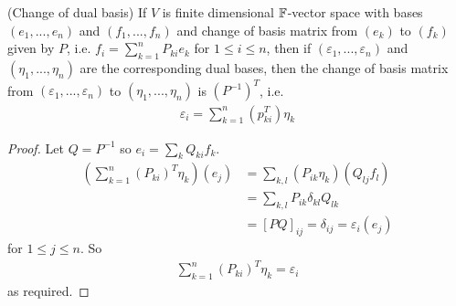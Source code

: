 \documentclass[a4paper]{article}
\begin{document}
\begin{prop} (Change of dual basis) If $V$ is finite dimensional $\mathbb{F}$-vector space with bases $\left(e_1,...,e_n\right)$ and $\left(f_1,...,f_n\right)$ and change of basis matrix from $\left(e_k\right)$ to $\left(f_k\right)$ given by $P$, i.e. $f_i = \sum_{k=1}^n P_{ki}e_k$ for $1 \leq i \leq n$, then if $\left(\varepsilon_1,...,\varepsilon_n\right)$ and $\left(\eta_1,...,\eta_n\right)$ are the corresponding dual bases, then the change of basis matrix from $\left(\varepsilon_1,...,\varepsilon_n\right)$ to $\left(\eta_1,...,\eta_n\right)$ is $\left(P^{-1}\right)^T$, i.e.
\begin{equation*}
\begin{aligned}
\varepsilon_i = \sum_{k=1}^n \left(p_{ki}^T\right) \eta_k
\end{aligned}
\end{equation*}

\begin{proof}
Let $Q=P^{-1}$ so $e_i = \sum_k Q_{ki} f_k$. 
\begin{equation*}
\begin{aligned}
\left(\sum_{k=1}^n \left(P_{ki}\right)^T \eta_k\right)\left(e_j\right) &= \sum_{k,l} \left(P_{ik}\eta_k\right)\left(Q_{lj}f_l\right)\\
&= \sum_{k,l} P_{ik} \delta_{kl}Q_{lk}\\
&= \left[PQ\right]_{ij} = \delta_{ij} = \varepsilon_i \left(e_j\right)
\end{aligned}
\end{equation*}
for $1\leq j\leq n$. So
\begin{equation*}
\begin{aligned}
\sum_{k=1}^n \left(P_{ki}\right)^T \eta_k =\varepsilon_i
\end{aligned}
\end{equation*}
as required.
\end{proof}
\end{prop}
\end{document}
